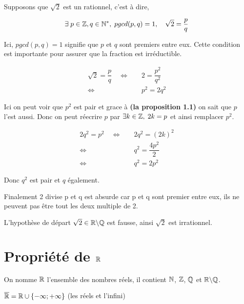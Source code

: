 \documentclass[a4paper, 12pt]{article}
\begin{document}
\begin{demonstration}
    Supposons que $\sqrt{2}$ est un rationnel, c'est à dire,
    
    \begin{align*}
        \exists \; p \in \mathbb{Z}, q \in \mathbb{N}^*, \; pgcd(p, q) = 1, \quad \sqrt{2}=\dfrac{p}{q}
    \end{align*}

    Ici, $pgcd(p, q) = 1$ signifie que $p$ et $q$ sont premiers entre eux. Cette condition est importante pour assurer que la fraction est irréductible.


    \begin{align*}
        \sqrt{2} = \dfrac{p}{q} \quad \iff& \quad 2 = \dfrac{p^2}{q^2} \\
        \iff& \quad p^2 = 2q^2
    \end{align*}

    \vspace{0.5em}
    Ici on peut voir que $p^2$ est pair et grace à \textbf{(la proposition 1.1)} on sait que $p$ l'est aussi.
    Donc on peut réecrire $p$ par $\exists k \in \mathbb{Z}, \; 2k = p$
    et ainsi remplacer $p^2$.

    \nobreak

    \begin{align*}
        2q^2 = p^2 \quad \iff& \quad 2q^2 = (2k)^2 \\
        \iff& \quad q^2 = \dfrac{4p^2}{2} \\
        \iff& \quad q^2 = 2p^2
    \end{align*}

    Donc $q^2$ est pair et $q$ également.

    Finalement 2 divise p et q est absurde car p et q sont premier entre eux, ils ne peuvent pas être tout les deux multiple de 2.

    L'hypothèse de départ $\sqrt{2} \in \mathbb{R} \backslash \mathbb{Q}$ est fausse, ainsi $\sqrt{2}$ est irrationnel.
\end{demonstration}

\section{Propriété de $\mathbb{R}$}

On nomme $\mathbb{R}$ l'ensemble des nombres réels, il contient $\mathbb{N}$, $\mathbb{Z}$, $\mathbb{Q}$ et $\mathbb{R} \backslash \mathbb{Q}$.

$\overline{\mathbb{R}} = \mathbb{R} \cup \{-\infty; +\infty\}$ (les réels et l'infini)
\end{document}
